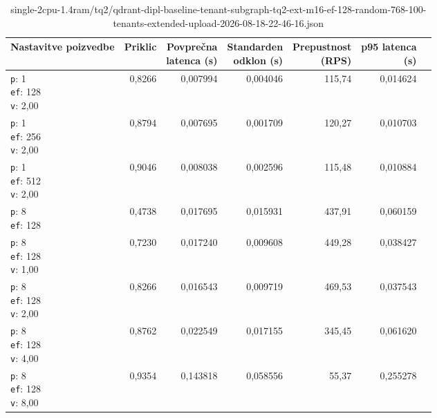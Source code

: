 \begin{table}[htbp]
  \centering
\small
  \caption{single-2cpu-1.4ram/tq2/qdrant-dipl-baseline-tenant-subgraph-tq2-ext-m16-ef-128-random-768-100-tenants-extended-upload-2026-08-18-22-46-16.json}
  \label{tab:single-2cpu-1.4ram:tq2:qdrant-dipl-baseline-tenant-subgraph-tq2-ext-m16-ef-128-random-768-100-tenants-extended-upload-2026-08-18-22-46-16.json}
  \begin{tabularx}{\textwidth}{Xrrrrrr}
    \toprule
    Nastavitve poizvedbe & Priklic & \makecell{Povprečna\\latenca (s)} & \makecell{Standarden\\odklon (s)} & \makecell{Prepustnost\\(RPS)} & \makecell{p95 latenca\\(s)}  \\
    \midrule
    \makecell{\texttt{p}: 1\\\texttt{ef}: 128\\\texttt{v}: 2,00} & 0,8266 & 0,007994 & 0,004046 & 115,74 & 0,014624 \\
    \makecell{\texttt{p}: 1\\\texttt{ef}: 256\\\texttt{v}: 2,00} & 0,8794 & 0,007695 & 0,001709 & 120,27 & 0,010703 \\
    \makecell{\texttt{p}: 1\\\texttt{ef}: 512\\\texttt{v}: 2,00} & 0,9046 & 0,008038 & 0,002596 & 115,48 & 0,010884 \\
    \makecell{\texttt{p}: 8\\\texttt{ef}: 128} & 0,4738 & 0,017695 & 0,015931 & 437,91 & 0,060159 \\
    \makecell{\texttt{p}: 8\\\texttt{ef}: 128\\\texttt{v}: 1,00} & 0,7230 & 0,017240 & 0,009608 & 449,28 & 0,038427 \\
    \makecell{\texttt{p}: 8\\\texttt{ef}: 128\\\texttt{v}: 2,00} & 0,8266 & 0,016543 & 0,009719 & 469,53 & 0,037543 \\
    \makecell{\texttt{p}: 8\\\texttt{ef}: 128\\\texttt{v}: 4,00} & 0,8762 & 0,022549 & 0,017155 & 345,45 & 0,061620 \\
    \makecell{\texttt{p}: 8\\\texttt{ef}: 128\\\texttt{v}: 8,00} & 0,9354 & 0,143818 & 0,058556 & 55,37 & 0,255278 \\

\end{tabularx}
\end{table}
